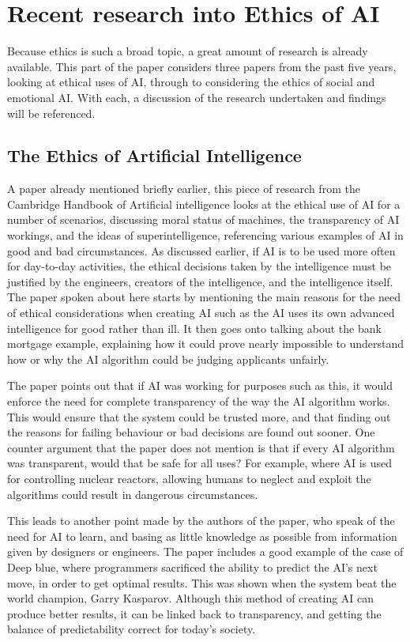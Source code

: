 \documentclass[article]{IEEEtran}
\begin{document}
\section{Recent research into Ethics of AI}
Because ethics is such a broad topic, a great amount of research is already available. This part of the paper considers three papers from the past five years, looking at ethical uses of AI, through to considering the ethics of social and emotional AI. With each, a discussion of the research undertaken and findings will be referenced.

\subsection{The Ethics of Artificial Intelligence}
A paper already mentioned briefly earlier, this piece of research from the Cambridge Handbook of Artificial intelligence \cite{ethics important} looks at the ethical use of AI for a number of scenarios, discussing moral status of machines, the transparency of AI workings, and the ideas of superintelligence, referencing various examples of AI in good and bad circumstances. 
As discussed earlier, if AI is to be used more often for day-to-day activities, the ethical decisions taken by the intelligence must be justified by the engineers, creators of the intelligence, and the intelligence itself. The paper spoken about here starts by mentioning the main reasons for the need of ethical considerations when creating AI such as the AI uses its own advanced intelligence for good rather than ill. It then goes onto talking about the bank mortgage example, explaining how it could prove nearly impossible to understand how or why the AI algorithm could be judging applicants unfairly. \par
The paper points out that if AI was working for purposes such as this, it would enforce the need for complete transparency of the way the AI algorithm works. This would ensure that the system could be trusted more, and that finding out the reasons for failing behaviour or bad decisions are found out sooner. One counter argument that the paper does not mention is that if every AI algorithm was transparent, would that be safe for all uses? For example, where AI is used for controlling nuclear reactors, allowing humans to neglect and exploit the algorithms could result in dangerous circumstances. \par
This leads to another point made by the authors of the paper, who speak of the need for AI to learn, and basing as little knowledge as possible from information given by designers or engineers. The paper includes a good example of the case of Deep blue, where programmers sacrificed the ability to predict the AI’s next move, in order to get optimal results. This was shown when the system beat the world champion, Garry Kasparov. Although this method of creating AI can produce better results, it can be linked back to transparency, and getting the balance of predictability correct for today’s society.\par
\end{document}
